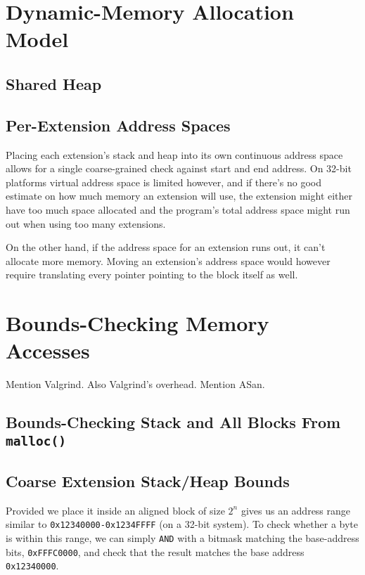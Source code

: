 \section {Dynamic-Memory Allocation Model}

\subsection {Shared Heap}

\subsection {Per-Extension Address Spaces}

Placing each extension's stack and heap into its own continuous address space
allows for a single coarse-grained check against start and end address. On
32-bit platforms virtual address space is limited however, and if there's no
good estimate on how much memory an extension will use, the extension might
either have too much space allocated and the program's total address space
might run out when using too many extensions.

On the other hand, if the address space for an extension runs out, it can't
allocate more memory. Moving an extension's address space would however require
translating every pointer pointing to the block itself as well.

\section {Bounds-Checking Memory Accesses}

Mention Valgrind. Also Valgrind's overhead. Mention ASan.

\subsection {Bounds-Checking Stack and All Blocks From \texttt{malloc()} }

\subsection {Coarse Extension Stack/Heap Bounds}

Provided we place it inside an aligned block of size $2^n$ gives us an address
range similar to \texttt{0x12340000-0x1234FFFF} (on a 32-bit system). To check
whether a byte is within this range, we can simply \texttt{AND} with a bitmask
matching the base-address bits, \texttt{0xFFFC0000}, and check that the result
matches the base address \texttt{0x12340000}.

